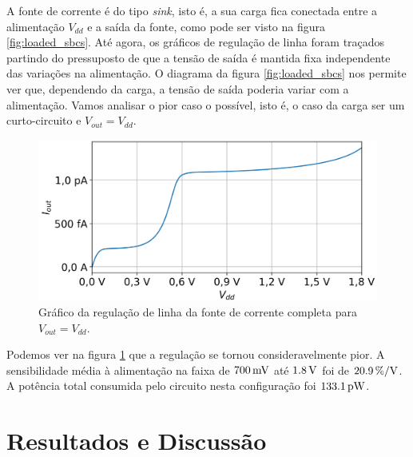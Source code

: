 \documentclass[10pt,a4paper]{extreport}
\newcommand{\?}{\stackrel{?}{=}}
\newcommand{\sis}[2]{\complexnum{#1}\,\si[per-mode=symbol]{#2}}
\newcommand{\mysize}{0.69}
\begin{document}
A fonte de corrente é do tipo \textit{sink}, isto é, a sua carga fica conectada entre a alimentação $V_{dd}$ e a saída da fonte, como pode ser visto na figura \ref{fig:loaded_sbcs}. Até agora, os gráficos de regulação de linha foram traçados partindo do pressuposto de que a tensão de saída é mantida fixa independente das variações na alimentação. O diagrama da figura \ref{fig:loaded_sbcs} nos permite ver que, dependendo da carga, a tensão de saída poderia variar com a alimentação. Vamos analisar o pior caso o possível, isto é, o caso da carga ser um curto-circuito e $V_{out}=V_{dd}$.

\begin{figure}[htp!]
    \includegraphics[width=\mysize\linewidth]{Imagens/mirror_vout_equal_vdd.png}
    \centering
    \caption{Gráfico da regulação de linha da fonte de corrente completa para $V_{out}=V_{dd}$.}
    \label{fig:mirror_vout_equal_vdd}
\end{figure}

Podemos ver na figura \ref{fig:mirror_vout_equal_vdd} que a regulação se tornou consideravelmente pior. A sensibilidade média à alimentação na faixa de $\sis{700}{\milli\volt}$ até $\sis{1.8}{\volt}$ foi de $\sis{20.9}{\percent\per\volt}$. A potência total consumida pelo circuito nesta configuração foi $\sis{133.1}{\pico\watt}$.

\chapter{Resultados e Discussão}
\end{document}
